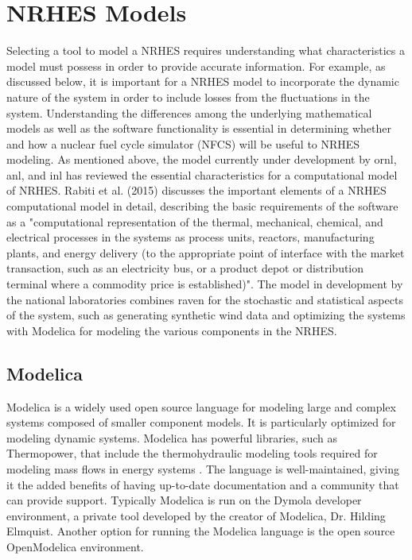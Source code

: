 \documentclass[12pt]{UIdahoMastersThesis}
\begin{document}
\section{NRHES Models}
Selecting a tool to model a NRHES requires understanding what characteristics a model must possess in order to provide accurate information. For example, as discussed below, it is important for a NRHES model to incorporate the dynamic nature of the system in order to include losses from the fluctuations in the system. Understanding the differences among the underlying mathematical models as well as the software functionality is essential in determining whether and how a nuclear fuel cycle simulator (NFCS) will be useful to NRHES modeling.
As mentioned above, the model currently under development by \ac{ornl}, \ac{anl}, and \ac{inl} has reviewed the essential characteristics for a computational model of NRHES. Rabiti et al. (2015) discusses the important elements of a NRHES computational model in detail, describing the basic requirements of the software as a "computational representation of the thermal, mechanical, chemical, and electrical processes in the systems as process units, reactors, manufacturing plants, and energy delivery (to the appropriate point of interface with the market transaction, such as an electricity bus, or a product depot or distribution terminal where a commodity price is established)"\cite{Rabiti2015}. The model in development by the national laboratories combines \ac{raven} for the stochastic and statistical aspects of the system, such as generating synthetic wind data and optimizing the systems with Modelica for modeling the various components in the NRHES.
\subsection{Modelica}
Modelica is a widely used open source language for modeling large and complex systems composed of smaller component models. It is particularly optimized for modeling dynamic systems. Modelica has powerful libraries, such as Thermopower, that include the thermohydraulic modeling tools required for modeling mass flows in energy systems \cite{Binder2014}. The language is well-maintained, giving it the added benefits of having up-to-date documentation and a community that can provide support. Typically Modelica is run on the Dymola developer environment, a private tool developed by the creator of Modelica, Dr. Hilding Elmquist. Another option for running the Modelica language is the open source OpenModelica environment.
\end{document}
